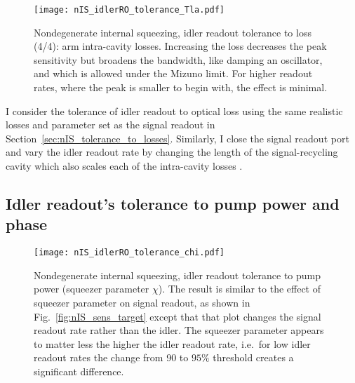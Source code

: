 \begin{figure}
    \centering
    \texttt{[image: nIS\_idlerRO\_tolerance\_Tla.pdf]} 
    \caption{  Nondegenerate internal squeezing, idler readout tolerance to loss (4/4): arm intra-cavity losses. Increasing the loss decreases the peak sensitivity but broadens the bandwidth, like damping an oscillator, and which is allowed under the Mizuno limit. For higher readout rates, where the peak is smaller to begin with, the effect is minimal.}
    \label{fig:nIS_idlerRO_tolerance_Tla}
\end{figure}


I consider the tolerance of idler readout to optical loss using the same realistic losses and parameter set as the signal readout in Section~\ref{sec:nIS_tolerance_to_losses}. Similarly, I close the signal readout port and vary the idler readout rate by changing the length of the signal-recycling cavity which also scales each of the intra-cavity losses .






\subsection{Idler readout's tolerance to pump power and phase}


\begin{figure}
	\centering
	\texttt{[image: nIS\_idlerRO\_tolerance\_chi.pdf]}
	\caption{ Nondegenerate internal squeezing, idler readout tolerance to pump power (squeezer parameter $\chi$). The result is similar to the effect of squeezer parameter on signal readout, as shown in Fig.~\ref{fig:nIS_sens_target} except that that plot changes the signal readout rate rather than the idler. The squeezer parameter appears to matter less the higher the idler readout rate, i.e.\ for low idler readout rates the change from 90 to $95\%$ threshold creates a significant  difference. }
	\label{fig:}
\end{figure}

